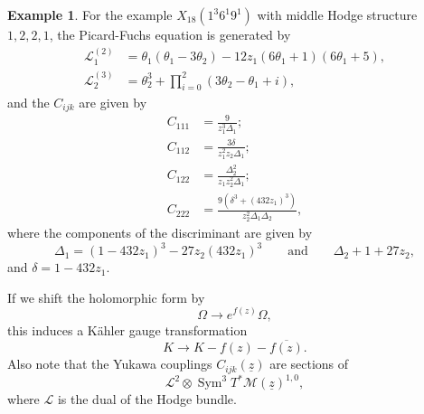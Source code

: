 \documentclass[10pt,oldfontcommands,oneside]{memoir}
\theoremstyle{definition}
\newtheorem{exm}[thm]{Example}
\theoremstyle{remark}
\theoremstyle{plain}
\theoremstyle{definition}
\theoremstyle{remark}
\newcommand{\mc}[1]{\mathcal{#1}}
\newcommand{\uz}{\ul{z}}
\newcommand{\on}[1]{\operatorname{#1}}
\newcommand{\ol}[1]{\overline{#1}}
\newcommand{\ul}[1]{\underline{#1}}
\newcommand{\1}{\mathbf{1}}
\newcommand{\2}{\mathbf{2}}
\newcommand{\3}{\mathbf{3}}
\begin{document}
\begin{exm}
    For the example $X_{18}(1^3 6^1 9^1)$ with middle Hodge structure $1,2,2,1$, the Picard-Fuchs equation is generated by
    \begin{align*}
        \mc{L}_1^{(2)} &= \theta_1 (\theta_1 - 3 \theta_2) - 12 z_1 (6 \theta_1 + 1) (6 \theta_1 + 5), \\
        \mc{L}_2^{(3)} &= \theta_2^3 + \prod_{i=0}^2 (3 \theta_2 - \theta_1 + i),
    \end{align*}
    and the $C_{ijk}$ are given by
    \begin{align*}
        C_{111} &= \frac{9}{z_1^3\Delta_1}; \\
        C_{112} &= \frac{3 \delta}{z_1^2 z_2 \Delta_1}; \\
        C_{122} &= \frac{\Delta_2^2}{z_1 z_2^2 \Delta_1}; \\
        C_{222} &= \frac{9(\delta^3 + (432z_1)^3)}{z_2^2 \Delta_1 \Delta_2},
    \end{align*}
    where the components of the discriminant are given by
    \[ \Delta_1 = (1-432z_1)^3 - 27z_2 (432z_1)^3 \qquad \text{and} \qquad \Delta_2 + 1 + 27 z_2, \]
    and $\delta = 1 - 432z_1$.
\end{exm}

If we shift the holomorphic form by
\[\Omega \to e^{f(z)} \Omega, \]
this induces a K\"ahler gauge transformation
\[ K \to K - f(z) - \ol{f(z)}. \]
Also note that the Yukawa couplings $C_{ijk}(\uz)$ are sections of
\[ \mc{L}^2 \otimes \on{Sym}^3 T^* \mc{M}(\uz)^{1,0}, \]
where $\mc{L}$ is the dual of the Hodge bundle.
\end{document}
